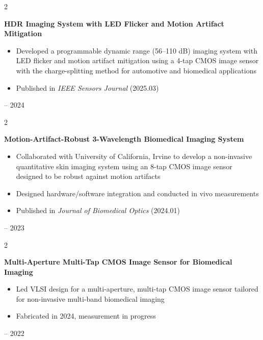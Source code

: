 \documentclass[10pt, letterpaper]{article}
\newenvironment{highlights}{
    \begin{itemize}[
        topsep=0.1cm,
        parsep=0.1cm,
        partopsep=0pt,
        itemsep=0.05cm,
        leftmargin=0.5cm
    ]
}{\end{itemize}}
\newenvironment{twocolentry}[2][]{
    \onecolentry
    \def\secondColumn{#2}
    \setcolumnwidth{\fill, 3.2cm}
    \begin{paracol}{2}
}{\switchcolumn \raggedleft \secondColumn \end{paracol} \endonecolentry}
\begin{document}
    \begin{twocolentry}{2023 – 2024}
        \textbf{HDR Imaging System with LED Flicker and Motion Artifact Mitigation}
        \begin{highlights}
            \item Developed a programmable dynamic range  (56–110 dB) imaging system with LED flicker and motion artifact mitigation using a 4-tap  CMOS image sensor with the charge-splitting method for automotive and biomedical applications 
            \item Published in \textit{IEEE Sensors Journal} (2025.03)
        \end{highlights}
    \end{twocolentry}

    \begin{twocolentry}{2022 – 2023}
        \textbf{Motion-Artifact-Robust 3-Wavelength Biomedical Imaging System}
        \begin{highlights}
            \item Collaborated with University of California, Irvine to develop a non-invasive quantitative skin imaging system using an 8-tap CMOS image sensor designed to be robust against motion artifacts
            \item Designed hardware/software integration and conducted in vivo measurements
            \item Published in \textit{Journal of Biomedical Optics} (2024.01)
        \end{highlights}
    \end{twocolentry}

    \begin{twocolentry}{2021 – 2022}
        \textbf{Multi-Aperture Multi-Tap CMOS Image Sensor for Biomedical Imaging}
        \begin{highlights}
            \item Led VLSI design for a multi-aperture, multi-tap CMOS image sensor tailored for non-invasive multi-band biomedical imaging
            \item Fabricated in 2024, measurement in progress
        \end{highlights}
    \end{twocolentry}
\end{document}
